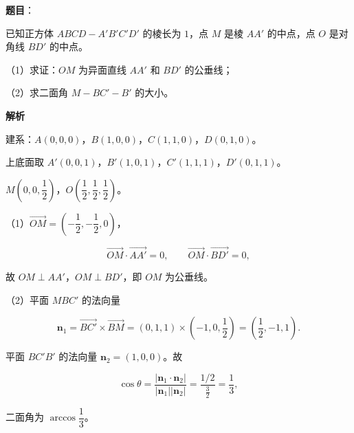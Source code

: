 \begin{answer}

\textbf{题目}：

已知正方体 $ABCD-A'B'C'D'$ 的棱长为 $1$，点 $M$ 是棱 $AA'$ 的中点，点 $O$ 是对角线 $BD'$ 的中点。

（1）求证：$OM$ 为异面直线 $AA'$ 和 $BD'$ 的公垂线；

（2）求二面角 $M-BC'-B'$ 的大小。
\nopagebreak[4]
\begin{center}\end{center}
\nopagebreak[4]
\textbf{解析}

建系：$A(0,0,0)$，$B(1,0,0)$，$C(1,1,0)$，$D(0,1,0)$。

上底面取 $A'(0,0,1)$，$B'(1,0,1)$，$C'(1,1,1)$，$D'(0,1,1)$。

$M\left(0,0,\dfrac12\right)$，$O\left(\dfrac12,\dfrac12,\dfrac12\right)$。

（1）$\overrightarrow{OM}=\left(-\dfrac12,-\dfrac12,0\right)$，

\nopagebreak[4]
\[\overrightarrow{OM}\cdot\overrightarrow{AA'}=0,\qquad
\overrightarrow{OM}\cdot\overrightarrow{BD'}=0,\]

故 $OM\perp AA'$，$OM\perp BD'$，即 $OM$ 为公垂线。

（2）平面 $MBC'$ 的法向量

\nopagebreak[4]
\[\boldsymbol n_1=\overrightarrow{BC'}\times\overrightarrow{BM}
=(0,1,1)\times\left(-1,0,\frac12\right)=\left(\frac12,-1,1\right).\]

平面 $BC'B'$ 的法向量 $\boldsymbol n_2=(1,0,0)$。故

\nopagebreak[4]
\[\cos\theta=\frac{|\boldsymbol n_1\cdot\boldsymbol n_2|}{|\boldsymbol n_1||\boldsymbol n_2|}
=\frac{1/2}{\frac32}=\frac13,\]

二面角为 $\arccos\dfrac13$。


\end{answer}
